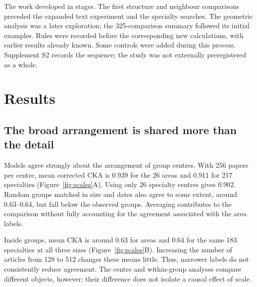 \documentclass[12pt]{article}
\begin{document}
The work developed in stages. The first structure and neighbour comparisons preceded the expanded text experiment and the specialty searches. The geometric analysis was a later exploration; the 325-comparison summary followed its initial examples. Rules were recorded before the corresponding new calculations, with earlier results already known. Some controls were added during this process. Supplement S2 records the sequence; the study was not externally preregistered as a whole.

\section{Results}
\FloatBarrier
\subsection{The broad arrangement is shared more than the detail}
Models agree strongly about the arrangement of group centres. With 256 papers per centre, mean corrected CKA is 0.939 for the 26 areas and 0.911 for 217 specialties (Figure~\ref{fig:scales}A). Using only 26 specialty centres gives 0.902. Random groups matched in size and dates also agree to some extent, around 0.63--0.64, but fall below the observed groups. Averaging contributes to the comparison without fully accounting for the agreement associated with the area labels.

Inside groups, mean CKA is around 0.63 for areas and 0.64 for the same 183 specialties at all three sizes (Figure~\ref{fig:scales}B). Increasing the number of articles from 128 to 512 changes these means little. Thus, narrower labels do not consistently reduce agreement. The centre and within-group analyses compare different objects, however; their difference does not isolate a causal effect of scale.
\end{document}
